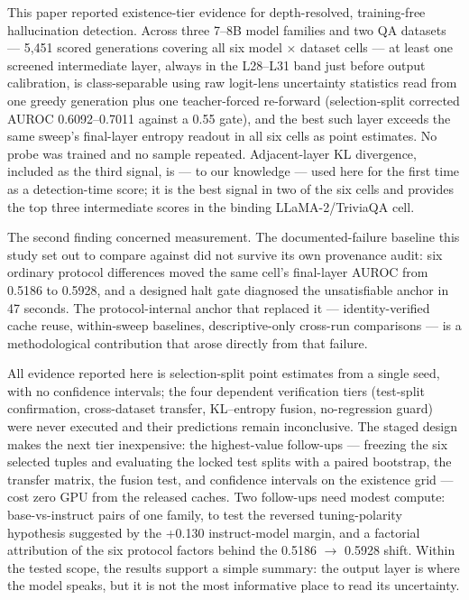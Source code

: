 
This paper reported existence-tier evidence for depth-resolved, training-free hallucination detection. Across three 7--8B model families and two QA datasets --- 5,451 scored generations covering all six model $\times$ dataset cells --- at least one screened intermediate layer, always in the L28--L31 band just before output calibration, is class-separable using raw logit-lens uncertainty statistics read from one greedy generation plus one teacher-forced re-forward (selection-split corrected AUROC 0.6092--0.7011 against a 0.55 gate), and the best such layer exceeds the same sweep's final-layer entropy readout in all six cells as point estimates. No probe was trained and no sample repeated. Adjacent-layer KL divergence, included as the third signal, is --- to our knowledge --- used here for the first time as a detection-time score; it is the best signal in two of the six cells and provides the top three intermediate scores in the binding LLaMA-2/TriviaQA cell.

The second finding concerned measurement. The documented-failure baseline this study set out to compare against did not survive its own provenance audit: six ordinary protocol differences moved the same cell's final-layer AUROC from 0.5186 to 0.5928, and a designed halt gate diagnosed the unsatisfiable anchor in 47 seconds. The protocol-internal anchor that replaced it --- identity-verified cache reuse, within-sweep baselines, descriptive-only cross-run comparisons --- is a methodological contribution that arose directly from that failure.

All evidence reported here is selection-split point estimates from a single seed, with no confidence intervals; the four dependent verification tiers (test-split confirmation, cross-dataset transfer, KL--entropy fusion, no-regression guard) were never executed and their predictions remain inconclusive. The staged design makes the next tier inexpensive: the highest-value follow-ups --- freezing the six selected tuples and evaluating the locked test splits with a paired bootstrap, the transfer matrix, the fusion test, and confidence intervals on the existence grid --- cost zero GPU from the released caches. Two follow-ups need modest compute: base-vs-instruct pairs of one family, to test the reversed tuning-polarity hypothesis suggested by the +0.130 instruct-model margin, and a factorial attribution of the six protocol factors behind the 0.5186 $\rightarrow$ 0.5928 shift. Within the tested scope, the results support a simple summary: the output layer is where the model speaks, but it is not the most informative place to read its uncertainty.
